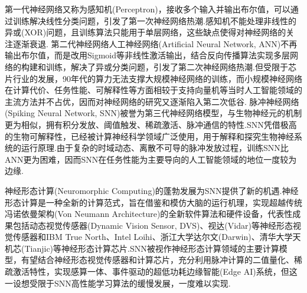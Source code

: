 \documentclass{SCIS2020cn}
\begin{document}
第一代神经网络又称为感知机(Perceptron)\cite{rosenblatt1958perceptron}，接收多个输入并输出布尔值，可以通过训练解决线性分类问题，引发了第一次神经网络热潮.感知机不能处理非线性的异或(XOR)问题，且训练算法只能用于单层网络，这些缺点使得对神经网络的关注逐渐衰退.
第二代神经网络人工神经网络(Artificial Neural Network, ANN)不再输出布尔值，而是改用Sigmoid等非线性激活输出，结合反向传播算法\cite{rumelhart1986learning}实现多层网络的构建和训练，解决了异或分类问题，引发了第二次神经网络热潮.但受限于芯片行业的发展，90年代的算力无法支撑大规模神经网络的训练，而小规模神经网络在计算代价、任务性能、可解释性等方面相较于支持向量机\cite{cortes1995support}等当时人工智能领域的主流方法并不占优，因而对神经网络的研究又逐渐陷入第二次低谷.
脉冲神经网络(Spiking Neural Network, SNN)被誉为第三代神经网络模型\cite{maass1997networks}，与生物神经元的机制更为相似，拥有积分发放、阈值触发、稀疏激活、脉冲通信的特性.SNN凭借极高的生物可解释性，已经被计算神经科学领域广泛使用\cite{gewaltig2007nest, spaun, Stimberg2019}，用于解释和探究生物神经系统的运行原理.由于复杂的时域动态、离散不可导的脉冲发放过程，训练SNN比ANN更为困难，因而SNN在任务性能为主要导向的人工智能领域的地位一度较为边缘.

神经形态计算(Neuromorphic Computing)\cite{mead1990neuromorphic, roy2019towards}的蓬勃发展为SNN提供了新的机遇.神经形态计算是一种全新的计算范式，旨在借鉴和模仿大脑的运行机理，实现超越传统冯诺依曼架构(Von Neumann Architecture)的全新软件算法和硬件设备，代表性成果包括动态视觉传感器(Dynamic Vision Sensor, DVS)\cite{lichtsteiner2008128}、视达(Vidar)\cite{dong2017spike}等神经形态视觉传感器和IBM True North\cite{merolla2014million}、Intel Loihi\cite{loihi}、浙江大学达尔文(Darwin)\cite{ma2017darwin}、清华大学天机芯(Tianjic)\cite{pei2019towards}等神经形态计算芯片.SNN被视作神经形态计算领域的主要计算模型，有望结合神经形态视觉传感器和计算芯片，充分利用脉冲计算的二值量化、稀疏激活特性，实现感算一体、事件驱动的超低功耗边缘智能(Edge AI)系统\cite{roy2019towards}，但这一设想受限于SNN高性能学习算法的缓慢发展，一度难以实现.
\end{document}
